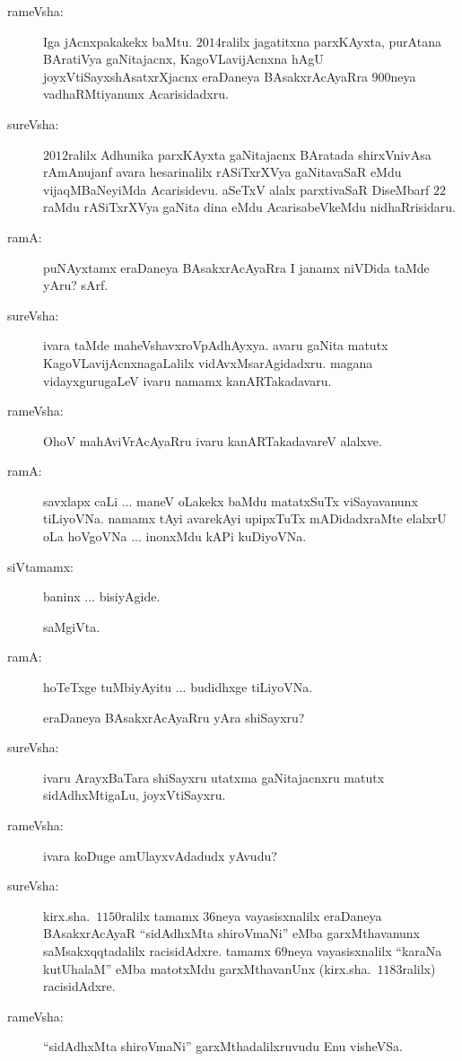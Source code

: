 \begin{description}
\item[rameVsha:] Iga jAcnxpakakekx baMtu. $2014$ralilx jagatitxna parxKAyxta, purAtana BAratiVya gaNitajacnx, KagoVLavijAcnxna hAgU joyxVtiSayxshAsatxrXjacnx eraDaneya BAsakxrAcAyaRra $900$neya vadhaRMtiyanunx Acarisidadxru.

\item[sureVsha:] $2012$ralilx Adhunika parxKAyxta gaNitajacnx BAratada shirxVnivAsa rAmAnujanf avara hesarinalilx rASiTxrXVya gaNitavaSaR eMdu vijaqMBaNeyiMda Acarisidevu. aSeTxV alalx parxtivaSaR DiseMbarf $22$raMdu rASiTxrXVya gaNita dina eMdu AcarisabeVkeMdu nidhaRrisidaru.

\item[ramA:] puNAyxtamx eraDaneya BAsakxrAcAyaRra I janamx niVDida taMde yAru? sArf.

\item[sureVsha:] ivara taMde maheVshavxroVpAdhAyxya. avaru gaNita matutx KagoVLa\-vijAcnxnagaLalilx vidAvxMsarAgidadxru. magana vidayxgurugaLeV ivaru namamx kanARTakadavaru.

\item[rameVsha:] OhoV mahAviVrAcAyaRru ivaru kanARTakadavareV alalxve.

\item[ramA:] savxlapx caLi ... maneV oLakekx baMdu matatxSuTx viSayavanunx tiLiyoVNa. namamx tAyi avarekAyi upipxTuTx mADidadxraMte elalxrU oLa hoVgoVNa ... inonxMdu kAPi kuDiyoVNa.

\item[siVtamamx:] baninx ... bisiyAgide.

saMgiVta.

\item[ramA:] hoTeTxge tuMbiyAyitu ... budidhxge tiLiyoVNa.

eraDaneya BAsakxrAcAyaRru yAra shiSayxru?

\item[sureVsha:] ivaru ArayxBaTara shiSayxru utatxma gaNitajacnxru matutx sidAdhxMtigaLu, joyxVtiSayxru.

\item[rameVsha:] ivara koDuge amUlayxvAdadudx yAvudu?

\item[sureVsha:] kirx.sha.\ $1150$ralilx tamamx $36$neya vayasisxnalilx eraDaneya BAsakxrAcAyaR ``sidAdhxMta shiroVmaNi'' eMba garxMthavanunx saMsakxqqtadalilx racisidAdxre. tamamx $69$neya vayasisxnalilx ``karaNa kutUhalaM'' eMba matotxMdu garxMthavanUnx (kirx.sha.\ $1183$ralilx) racisidAdxre.

\item[rameVsha:] ``sidAdhxMta shiroVmaNi'' garxMthadalilxruvudu Enu visheVSa.


\end{description}
